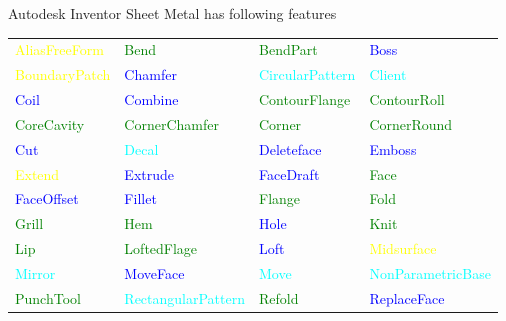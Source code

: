 \begin{frame}{Autodesk Inventor Sheet Metal has following features}

\begin{table}[!h]
\begin{tabular}[h]{@{}l l l l @{}}

\textcolor{yellow}{AliasFreeForm}	&
\textcolor{green}{Bend} &
\textcolor{green}{BendPart} &
\textcolor{blue}{Boss} \\

\textcolor{yellow}{BoundaryPatch} &
\textcolor{blue}{Chamfer} &
\textcolor{cyan}{CircularPattern} &
\textcolor{cyan}{Client} \\

\textcolor{blue}{Coil} &
\textcolor{blue}{Combine} &
\textcolor{green}{ContourFlange} &
\textcolor{green}{ContourRoll} \\

\textcolor{green}{CoreCavity} &
\textcolor{green}{CornerChamfer} &
\textcolor{green}{Corner} &
\textcolor{green}{CornerRound} \\

\textcolor{blue}{Cut} &
\textcolor{cyan}{Decal} &
\textcolor{blue}{Deleteface} &
\textcolor{blue}{Emboss} \\

\textcolor{yellow}{Extend} &
\textcolor{blue}{Extrude} &
\textcolor{blue}{FaceDraft} &
\textcolor{green}{Face} \\

\textcolor{blue}{FaceOffset} &
\textcolor{blue}{Fillet} &
\textcolor{green}{Flange} &
\textcolor{green}{Fold} \\

\textcolor{green}{Grill} &
\textcolor{green}{Hem} &
\textcolor{blue}{Hole} &
\textcolor{green}{Knit} \\

\textcolor{green}{Lip} &
\textcolor{green}{LoftedFlage} &
\textcolor{blue}{Loft} &
\textcolor{yellow}{Midsurface} \\

\textcolor{cyan}{Mirror} &
\textcolor{blue}{MoveFace} &
\textcolor{cyan}{Move} &
\textcolor{cyan}{NonParametricBase} \\

\textcolor{green}{PunchTool} &
\textcolor{cyan}{RectangularPattern} &
\textcolor{green}{Refold} &
\textcolor{blue}{ReplaceFace} \\


\end{tabular}
\end{table}
\end{frame}
